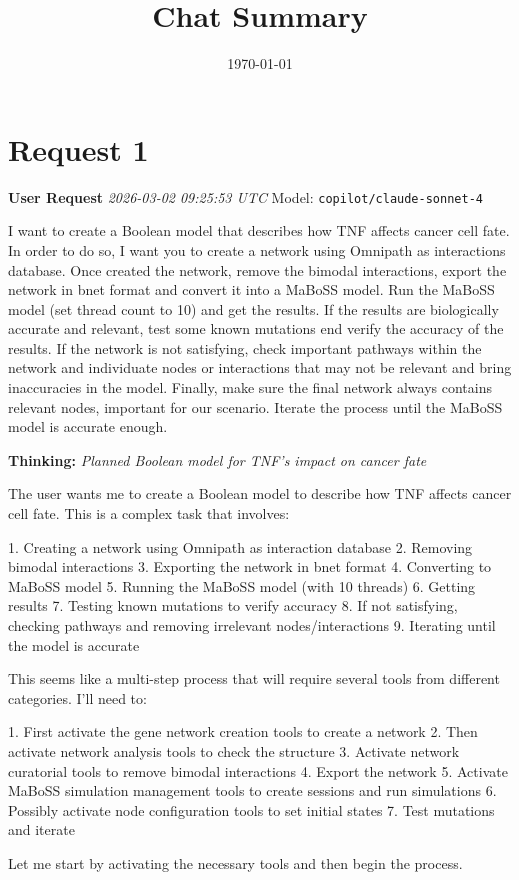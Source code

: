 \documentclass[11pt,a4paper]{article}
\title{Chat Summary}
\date{\today}
\begin{document}
\maketitle
\tableofcontents
\newpage

\section{Request 1}
\begin{userbox}
\textbf{User Request}
\quad \textit{2026-03-02 09:25:53 UTC}
\quad Model: \texttt{copilot/claude-sonnet-4}

I want to create a Boolean model that describes how TNF affects cancer cell fate. In order to do so, I want you to create a network using Omnipath as interactions database.
Once created the network, remove the bimodal interactions, export the network in bnet format and convert it into a MaBoSS model. Run the MaBoSS model (set thread count to 10) and get the results. If the results are biologically accurate and relevant, test some known mutations end verify the accuracy of the results. If the network is not satisfying, check important pathways within the network and individuate nodes or interactions that may not be relevant and bring inaccuracies in the model. Finally, make sure the final network always contains relevant nodes, important for our scenario.
Iterate the process until the MaBoSS model is accurate enough.

\end{userbox}
\begin{thinkbox}
\textbf{Thinking:} \textit{Planned Boolean model for TNF's impact on cancer fate}

The user wants me to create a Boolean model to describe how TNF affects cancer cell fate. This is a complex task that involves:

1. Creating a network using Omnipath as interaction database
2. Removing bimodal interactions  
3. Exporting the network in bnet format
4. Converting to MaBoSS model
5. Running the MaBoSS model (with 10 threads)
6. Getting results
7. Testing known mutations to verify accuracy
8. If not satisfying, checking pathways and removing irrelevant nodes/interactions
9. Iterating until the model is accurate

This seems like a multi-step process that will require several tools from different categories. I'll need to:

1. First activate the gene network creation tools to create a network
2. Then activate network analysis tools to check the structure
3. Activate network curatorial tools to remove bimodal interactions
4. Export the network 
5. Activate MaBoSS simulation management tools to create sessions and run simulations
6. Possibly activate node configuration tools to set initial states
7. Test mutations and iterate

Let me start by activating the necessary tools and then begin the process.

\end{thinkbox}
\end{document}
